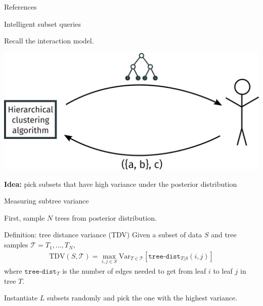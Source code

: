 \documentclass[10pt, compress]{beamer}
\begin{document}
\begin{frame}[allowframebreaks]{References}
    
     
\end{frame}
\appendix
\begin{frame}{Intelligent subset queries}

  Recall the interaction model.

  \begin{center}
    \includegraphics[width=\textwidth]{img/interaction-3}
  \end{center}

  \pause



  \textbf{Idea:}  pick subsets that have high variance
  under the posterior distribution

\end{frame}

\begin{frame}{Measuring subtree variance}

    First, sample $N$ trees from posterior distribution.

  \pause

  \begin{block}{Definition: tree distance variance (TDV)}
    Given a subset of data $S$ and tree samples $\mathcal{T} = T_1, \ldots, T_N$,
    \begin{align}
      \mathrm{TDV}(S, \mathcal{T}) = \max_{i, j \in S}  \mathrm{Var}_{T \in \mathcal{T}}\left[\texttt{tree-dist}_{T|S}(i, j)\right]
    \end{align}
  where $\texttt{tree-dist}_T$ is the number of edges needed to get from leaf $i$ to leaf $j$
  in tree $T$.
  \end{block}

  \pause

Instantiate $L$ subsets randomly and pick the one with the highest variance.

\end{frame}
\end{document}
